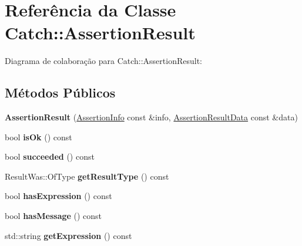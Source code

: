 \hypertarget{classCatch_1_1AssertionResult}{}\section{Referência da Classe Catch\+:\+:Assertion\+Result}
\label{classCatch_1_1AssertionResult}


Diagrama de colaboração para Catch\+:\+:Assertion\+Result\+:
\subsection*{Métodos Públicos}
\begin{DoxyCompactItemize}
\item 
{\bfseries Assertion\+Result} (\hyperlink{structCatch_1_1AssertionInfo}{Assertion\+Info} const \&info, \hyperlink{structCatch_1_1AssertionResultData}{Assertion\+Result\+Data} const \&data)\hypertarget{classCatch_1_1AssertionResult_ab58aeec27052ba400633ed0e36cea692}{}\label{classCatch_1_1AssertionResult_ab58aeec27052ba400633ed0e36cea692}

\item 
bool {\bfseries is\+Ok} () const \hypertarget{classCatch_1_1AssertionResult_a70fb6aa62a38db3bdcafb4bb134afb21}{}\label{classCatch_1_1AssertionResult_a70fb6aa62a38db3bdcafb4bb134afb21}

\item 
bool {\bfseries succeeded} () const \hypertarget{classCatch_1_1AssertionResult_a5404062147930354afeb154de7cbaa7e}{}\label{classCatch_1_1AssertionResult_a5404062147930354afeb154de7cbaa7e}

\item 
Result\+Was\+::\+Of\+Type {\bfseries get\+Result\+Type} () const \hypertarget{classCatch_1_1AssertionResult_aa90bec8064879a62fcdc8e1079bcdba1}{}\label{classCatch_1_1AssertionResult_aa90bec8064879a62fcdc8e1079bcdba1}

\item 
bool {\bfseries has\+Expression} () const \hypertarget{classCatch_1_1AssertionResult_a45551f4f092c640ffce0cdd8a94f4b62}{}\label{classCatch_1_1AssertionResult_a45551f4f092c640ffce0cdd8a94f4b62}

\item 
bool {\bfseries has\+Message} () const \hypertarget{classCatch_1_1AssertionResult_ab22a1c9baa182aeb2549fffeb8294d9e}{}\label{classCatch_1_1AssertionResult_ab22a1c9baa182aeb2549fffeb8294d9e}

\item 
std\+::string {\bfseries get\+Expression} () const \hypertarget{classCatch_1_1AssertionResult_a6105300b90d66b5c11b69813f83d074d}{}\label{classCatch_1_1AssertionResult_a6105300b90d66b5c11b69813f83d074d}


\end{DoxyCompactItemize}
